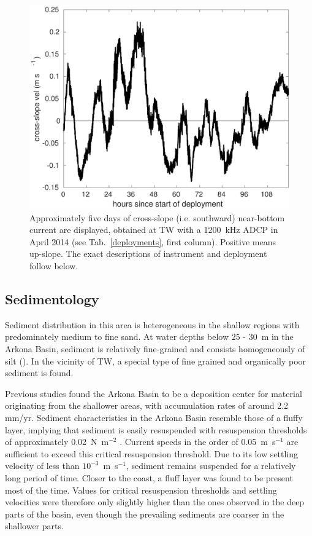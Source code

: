  \begin{figure}[ht]
\includegraphics[width=40pc]{bilder/abslope.pdf}
 \caption{Approximately five days of cross-slope (i.e. southward) 
near-bottom current are displayed, obtained at TW with a 1200~kHz ADCP in April 
2014 (see Tab.\ \ref{deployments}, first column). Positive means up-slope. The 
exact descriptions of instrument and deployment follow below.} \label{abslope}
 \end{figure}

 \FloatBarrier
\subsection{Sedimentology}\label{sedmol}

  Sediment distribution in this area is heterogeneous in the shallow regions 
with predominately medium to fine sand. At water depths below 25 - 30~m in the 
Arkona Basin, sediment is relatively fine-grained and consists homogeneously of 
silt (). In the vicinity of TW, a special type of fine grained 
and organically poor sediment is found. 

Previous studies \citep[][]{leipe2000, basys1} found the Arkona Basin to be a 
deposition center for material originating from the shallower areas, with 
accumulation rates of around 2.2 mm/yr. Sediment characteristics in the Arkona 
Basin resemble those of a fluffy layer, implying that sediment is easily 
resuspended with resuspension thresholds of approximately 0.02~N~m$^{-2}$ 
\citep[][determined with a LABEREX chamber from sediment core 
samples]{basys1}. Current speeds in the order of 
0.05~m~s$^{-1}$ are sufficient to exceed this critical resuspension threshold. 
Due to its low settling velocity of less than $10^{-3}$~m~s$^{-1}$, sediment 
remains suspended for a relatively long period of time. Closer to the coast, a 
fluff layer was found to be present most of the time. Values for critical 
resuspension thresholds and settling velocities were therefore only slightly 
higher than the ones observed in the deep parts of the basin, even though the 
prevailing sediments are coarser in the shallower parts. %

